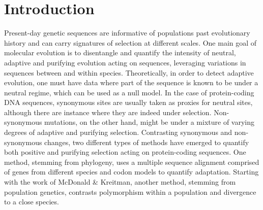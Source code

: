 \documentclass{article}
\begin{document}
    \section*{Introduction}
    Present-day genetic sequences are informative of populations past evolutionary history and can carry signatures of selection at different scales.
    One main goal of molecular evolution is to disentangle and quantify the intensity of neutral, adaptive and purifying evolution acting on sequences, leveraging variations in sequences between and within species.
    Theoretically, in order to detect adaptive evolution, one must have data where part of the sequence is known to be under a neutral regime, which can be used as a null model.
    In the case of protein-coding DNA sequences, synonymous sites are usually taken as proxies for neutral sites, although there are instance where they are indeed under selection\cite{duret_expression_1999, duret_evolution_2002, galtier_codon_2018}.
    Non-synonymous mutations, on the other hand, might be under a mixture of varying degrees of adaptive and purifying selection.
    Contrasting synonymous and non-synonymous changes, two different types of methods have emerged to quantify both positive and purifying selection acting on protein-coding sequences.
    One method, stemming from phylogeny, uses a multiple sequence alignment comprised of genes from different species and codon models to quantify adaptation\cite{muse_likelihood_1994,goldman_codonbased_1994}.
    Starting with the work of McDonald \& Kreitman\cite{mcdonald_adaptative_1991}, another method, stemming from population genetics, contrasts polymorphism within a population and divergence to a close species.
\end{document}
